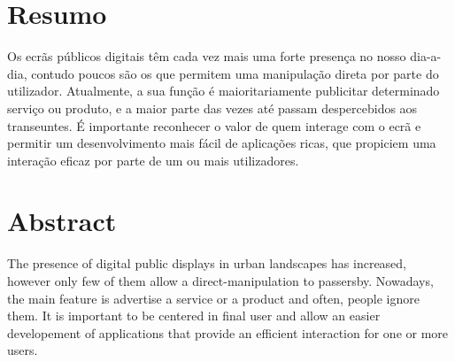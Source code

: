 \chapter*{Resumo}

Os ecrãs públicos digitais têm cada vez mais uma forte presença no nosso dia-a-dia, contudo poucos são os que permitem uma manipulação direta por parte do utilizador. Atualmente, a sua função é maioritariamente publicitar determinado serviço ou produto, e a maior parte das vezes até passam despercebidos aos transeuntes.
É importante reconhecer o valor de quem interage com o ecrã e permitir um desenvolvimento mais fácil de aplicações ricas, que propiciem uma interação eficaz por parte de um ou mais utilizadores. 

\chapter*{Abstract}

The presence of digital public displays in urban landscapes has increased, however only few of them allow a direct-manipulation to passersby. Nowadays, the main feature is advertise a service or a product and often, people ignore them. 
It is important to be centered in final user and allow an easier developement of applications that provide an efficient interaction for one or more users. 
